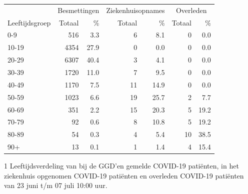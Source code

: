 \documentclass[
  english,
  man,floatsintext]{apa6}
\begin{document}
\begin{table}
\centering\begingroup\fontsize{11}{13}\selectfont

\begin{threeparttable}
\begin{tabular}{lrrrrrr}
\toprule
\multicolumn{1}{c}{ } & \multicolumn{2}{c}{Besmettingen} & \multicolumn{2}{c}{Ziekenhuisopnames} & \multicolumn{2}{c}{Overleden} \\
\cmidrule(l{3pt}r{3pt}){2-3} \cmidrule(l{3pt}r{3pt}){4-5} \cmidrule(l{3pt}r{3pt}){6-7}
Leeftijdsgroep & Totaal & \% & Totaal & \% & Totaal & \%\\
\midrule
0-9 & 516 & 3.3 & 6 & 8.1 & 0 & 0.0\\
10-19 & 4354 & 27.9 & 0 & 0.0 & 0 & 0.0\\
20-29 & 6307 & 40.4 & 3 & 4.1 & 0 & 0.0\\
30-39 & 1720 & 11.0 & 7 & 9.5 & 0 & 0.0\\
40-49 & 1170 & 7.5 & 11 & 14.9 & 0 & 0.0\\
50-59 & 1023 & 6.6 & 19 & 25.7 & 2 & 7.7\\
60-69 & 351 & 2.2 & 15 & 20.3 & 5 & 19.2\\
70-79 & 92 & 0.6 & 8 & 10.8 & 5 & 19.2\\
80-89 & 54 & 0.3 & 4 & 5.4 & 10 & 38.5\\
90+ & 13 & 0.1 & 1 & 1.4 & 4 & 15.4\\
\bottomrule
\end{tabular}
\begin{tablenotes}
\item[1] Leeftijdsverdeling van bij de GGD’en gemelde COVID-19 patiënten, in het ziekenhuis opgenomen COVID-19 patiënten en overleden COVID-19 patiënten van 23 juni t/m 07 juli 10:00 uur.
\end{tablenotes}
\end{threeparttable}
\endgroup{}
\end{table}

\newpage
\end{document}

